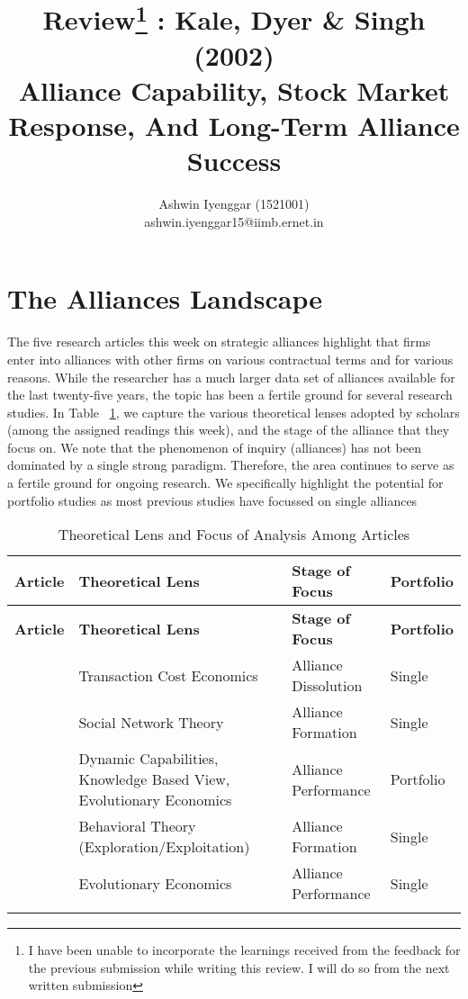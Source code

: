 \documentclass[12pt]{article}
\begin{document}
\title{Review\footnote{I have been unable to incorporate the learnings received from the feedback for the previous submission while writing this review. I will do so from the next written submission}  : Kale, Dyer \& Singh (2002)\\Alliance Capability, Stock Market Response, And Long-Term Alliance Success}
\author{Ashwin Iyenggar  (1521001) \\ ashwin.iyenggar15@iimb.ernet.in} 


\maketitle
\thispagestyle{empty}

\section{The Alliances Landscape}
The five research articles this week on strategic alliances highlight that firms enter into alliances with other firms on various contractual terms and for various reasons. While the researcher has a much larger data set of alliances available for the last twenty-five years, the topic has been a fertile ground for several research studies.  In Table ~\ref{table:theoreticallens}, we capture the various theoretical lenses adopted by scholars (among the assigned readings this week), and the stage of the alliance that they focus on. We note that the phenomenon of inquiry (alliances) has not been dominated by a single strong paradigm. Therefore, the area continues to serve as a fertile ground for ongoing research. We specifically highlight the potential for portfolio studies as most previous studies  have focussed on single alliances \citep{Wassmer2010, Kale2009}

\begin{center}
\begin{longtable}{|p{}|p{}|p{}|p{}|}
\hline \textbf{Article}&\textbf{Theoretical Lens}&\textbf{Stage of Focus}&\textbf{Portfolio}\\\hline
\endfirsthead
\hline \textbf{Article}&\textbf{Theoretical Lens}&\textbf{Stage of Focus}&\textbf{Portfolio}\\\hline
\endhead

\cite{Broschak2014}&Transaction Cost Economics&Alliance Dissolution&Single\\\hline
\cite{Gulati1995}&Social Network Theory&Alliance Formation&Single\\\hline
\cite{Kale2002}&Dynamic Capabilities, Knowledge Based View, Evolutionary Economics&Alliance Performance&Portfolio\\\hline
\cite{Lavie2006}&Behavioral Theory (Exploration/Exploitation)&Alliance Formation&Single\\\hline
\cite{Zollo2002}&Evolutionary Economics&Alliance Performance&Single\\\hline

\caption{Theoretical Lens and Focus of Analysis Among Articles}
\label{table:theoreticallens}\\
\end{longtable}
\end{center}
\end{document}
